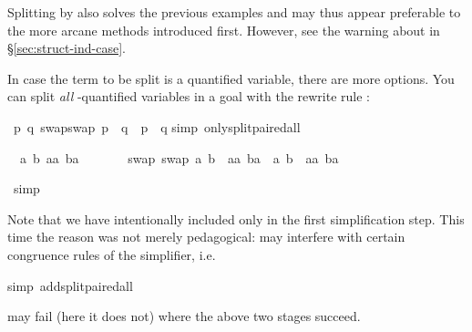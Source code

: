 \begin{isabellebody}
\begin{isamarkuptxt}
Splitting by  also solves the previous examples and may thus
appear preferable to the more arcane methods introduced first. However, see
the warning about  in \S\ref{sec:struct-ind-case}.

In case the term to be split is a quantified variable, there are more options.
You can split \emph{all} \isa{{\isasymAnd}}-quantified variables in a goal
with the rewrite rule :%
\end{isamarkuptxt}%
\ {\isachardoublequote}{\isasymAnd}p\ q{\isachardot}\ swap{\isacharparenleft}swap\ p{\isacharparenright}\ {\isacharequal}\ q\ {\isasymlongrightarrow}\ p\ {\isacharequal}\ q{\isachardoublequote}\isanewline
{}simp\ only{\isacharcolon}split{\isacharunderscore}paired{\isacharunderscore}all{\isacharparenright}%
\begin{isamarkuptxt}%
\noindent
\begin{isabelle}%
\ {}{\isachardot}\ {\isasymAnd}a\ b\ aa\ ba{\isachardot}\isanewline
\ \ \ \ \ \ \ swap\ {\isacharparenleft}swap\ {\isacharparenleft}a{\isacharcomma}\ b{\isacharparenright}{\isacharparenright}\ {\isacharequal}\ {\isacharparenleft}aa{\isacharcomma}\ ba{\isacharparenright}\ {\isasymlongrightarrow}\ {\isacharparenleft}a{\isacharcomma}\ b{\isacharparenright}\ {\isacharequal}\ {\isacharparenleft}aa{\isacharcomma}\ ba{\isacharparenright}%
\end{isabelle}%
\end{isamarkuptxt}%
\ simp\isanewline
{}%
\begin{isamarkuptext}%
\noindent
Note that we have intentionally included only 
in the first simplification step. This time the reason was not merely
pedagogical:
 may interfere with certain congruence
rules of the simplifier, i.e.%
\end{isamarkuptext}%
simp\ add{\isacharcolon}split{\isacharunderscore}paired{\isacharunderscore}all{\isacharparenright}%
\begin{isamarkuptext}%
\noindent
may fail (here it does not) where the above two stages succeed.


\end{isamarkuptext}
\end{isabellebody}
